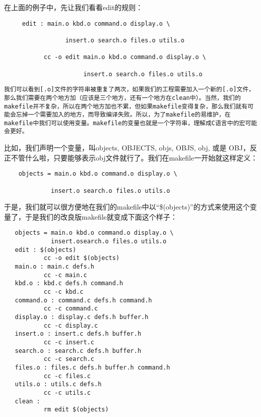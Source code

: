 \documentclass[]{book}
\begin{document}
在上面的例子中，先让我们看看edit的规则：

\begin{verbatim}
     edit : main.o kbd.o command.o display.o \

                 insert.o search.o files.o utils.o

           cc -o edit main.o kbd.o command.o display.o \

                      insert.o search.o files.o utils.o
\end{verbatim}

\begin{verbatim}
我们可以看到[.o]文件的字符串被重复了两次，如果我们的工程需要加入一个新的[.o]文件，那么我们需要在两个地方加（应该是三个地方，还有一个地方在clean中）。当然，我们的makefile并不复杂，所以在两个地方加也不累，但如果makefile变得复杂，那么我们就有可能会忘掉一个需要加入的地方，而导致编译失败。所以，为了makefile的易维护，在makefile中我们可以使用变量。makefile的变量也就是一个字符串，理解成C语言中的宏可能会更好。
\end{verbatim}

比如，我们声明一个变量，叫objects, OBJECTS, objs, OBJS, obj, 或是 OBJ，反正不管什么啦，只要能够表示obj文件就行了。我们在makefile一开始就这样定义：

\begin{verbatim}
    objects = main.o kbd.o command.o display.o \

             insert.o search.o files.o utils.o
\end{verbatim}

于是，我们就可以很方便地在我们的makefile中以``\$(objects)''的方式来使用这个变量了，于是我们的改良版makefile就变成下面这个样子：

\begin{verbatim}
   objects = main.o kbd.o command.o display.o \
             insert.osearch.o files.o utils.o 
   edit : $(objects)
           cc -o edit $(objects)
   main.o : main.c defs.h
           cc -c main.c
   kbd.o : kbd.c defs.h command.h
           cc -c kbd.c
   command.o : command.c defs.h command.h
           cc -c command.c
   display.o : display.c defs.h buffer.h
           cc -c display.c
   insert.o : insert.c defs.h buffer.h
           cc -c insert.c
   search.o : search.c defs.h buffer.h
           cc -c search.c
   files.o : files.c defs.h buffer.h command.h
           cc -c files.c
   utils.o : utils.c defs.h
           cc -c utils.c
   clean :
           rm edit $(objects)
\end{verbatim}
\end{document}
